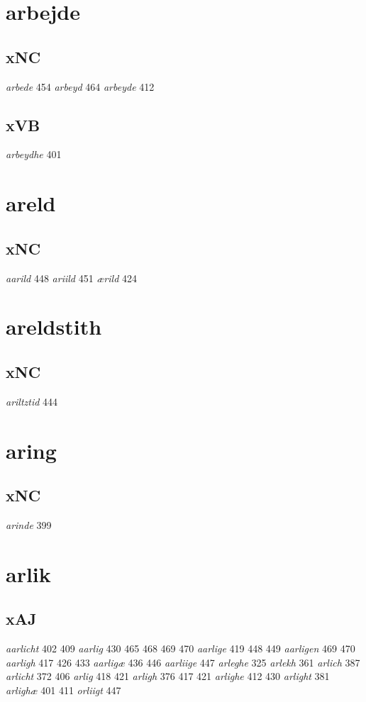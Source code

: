 \documentclass[a4paper,twocolumn]{article}
\begin{document}
\section{arbejde}
\label{sec:org71ed88d}
\subsection{xNC}
\label{sec:org297e31f}
\emph{arbede} 454 \emph{arbeyd} 464 \emph{arbeyde} 412 
\subsection{xVB}
\label{sec:orgda99c06}
\emph{arbeydhe} 401 
\section{areld}
\label{sec:org37a17a1}
\subsection{xNC}
\label{sec:org95dfd31}
\emph{aarild} 448 \emph{ariild} 451 \emph{ærild} 424 
\section{areldstith}
\label{sec:org79671ba}
\subsection{xNC}
\label{sec:orgfeb0bc4}
\emph{ariltztid} 444 
\section{aring}
\label{sec:org24b9a0a}
\subsection{xNC}
\label{sec:orgbb3ee84}
\emph{arinde} 399 
\section{arlik}
\label{sec:org402fe1b}
\subsection{xAJ}
\label{sec:orgd06ec20}
\emph{aarlicht} 402 409 \emph{aarlig} 430 465 468 469 470 \emph{aarlige} 419 448 449 \emph{aarligen} 469 470 \emph{aarligh} 417 426 433 \emph{aarligæ} 436 446 \emph{aarliige} 447 \emph{arleghe} 325 \emph{arlekh} 361 \emph{arlich} 387 \emph{arlicht} 372 406 \emph{arlig} 418 421 \emph{arligh} 376 417 421 \emph{arlighe} 412 430 \emph{arlight} 381 \emph{arlighæ} 401 411 \emph{orliigt} 447 
\end{document}
